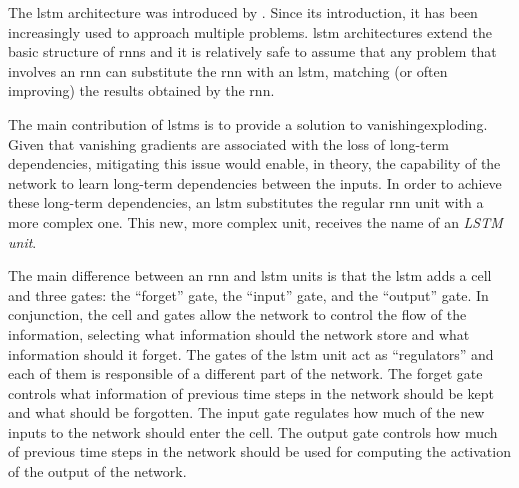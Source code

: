 

The \acrfull{lstm} architecture was introduced by
\textcite{hochreiter1997long}. Since its introduction, it
has been increasingly used to approach multiple problems.
\gls{lstm} architectures extend the basic structure of
\glspl{rnn} and it is relatively safe to assume that any
problem that involves an \gls{rnn} can substitute the
\gls{rnn} with an \gls{lstm}, matching (or often improving)
the results obtained by the \gls{rnn}.

The main contribution of \glspl{lstm} is to provide a
solution to \gls{vanishingexploding}. Given that vanishing
gradients are associated with the loss of long-term
dependencies, mitigating this issue would enable, in theory,
the capability of the network to learn long-term
dependencies between the inputs. In order to achieve these
long-term dependencies, an \gls{lstm} substitutes the
regular \gls{rnn} unit with a more complex one. This new,
more complex unit, receives the name of an \emph{LSTM unit}.

The main difference between an \gls{rnn} and \gls{lstm}
units is that the \gls{lstm} adds a cell and three gates:
the ``forget'' gate, the ``input'' gate, and the ``output''
gate. In conjunction, the cell and gates allow the network
to control the flow of the information, selecting what
information should the network store and what information
should it forget. The gates of the \gls{lstm} unit act as
``regulators'' and each of them is responsible of a
different part of the network. The forget gate controls what
information of previous time steps in the network should be
kept and what should be forgotten. The input gate regulates
how much of the new inputs to the network should enter the
cell. The output gate controls how much of previous time
steps in the network should be used for computing the
activation of the output of the network.
